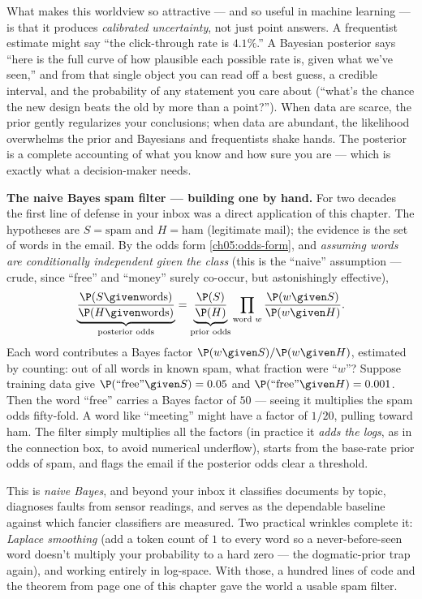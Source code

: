 \begin{aestheticbox}
What makes this worldview so attractive --- and so useful in machine learning --- is
that it produces \emph{calibrated uncertainty}, not just point answers. A frequentist
estimate might say ``the click-through rate is $4.1\%$.'' A Bayesian posterior says ``here
is the full curve of how plausible each possible rate is, given what we've seen,'' and
from that single object you can read off a best guess, a credible interval, and the
probability of any statement you care about (``what's the chance the new design beats the
old by more than a point?''). When data are scarce, the prior gently regularizes your
conclusions; when data are abundant, the likelihood overwhelms the prior and Bayesians and
frequentists shake hands. The posterior is a complete accounting of what you know and how
sure you are --- which is exactly what a decision-maker needs.
\end{aestheticbox}

\begin{applicationbox}
\textbf{The naive Bayes spam filter --- building one by hand.}
For two decades the first line of defense in your inbox was a direct application of this
chapter. The hypotheses are $S = \text{spam}$ and $H = \text{ham}$ (legitimate mail); the
evidence is the set of words in the email. By the odds form \eqref{ch05:odds-form}, and
\emph{assuming words are conditionally independent given the class} (this is the ``naive''
assumption --- crude, since ``free'' and ``money'' surely co-occur, but astonishingly
effective),
\[
  \underbrace{\frac{\P(S\given \text{words})}{\P(H\given \text{words})}}_{\text{posterior odds}}
  = \underbrace{\frac{\P(S)}{\P(H)}}_{\text{prior odds}}
    \prod_{\text{word } w}\frac{\P(w\given S)}{\P(w\given H)}.
\]
Each word contributes a Bayes factor $\P(w\given S)/\P(w\given H)$, estimated by counting:
out of all words in known spam, what fraction were ``$w$''? Suppose training data give
$\P(\text{``free''}\given S)=0.05$ and $\P(\text{``free''}\given H)=0.001$. Then the word
``free'' carries a Bayes factor of $50$ --- seeing it multiplies the spam odds fifty-fold.
A word like ``meeting'' might have a factor of $1/20$, pulling toward ham. The filter
simply multiplies all the factors (in practice it \emph{adds the logs}, as in the
connection box, to avoid numerical underflow), starts from the base-rate prior odds of
spam, and flags the email if the posterior odds clear a threshold.

This is \emph{naive Bayes}, and beyond your inbox it classifies documents by topic,
diagnoses faults from sensor readings, and serves as the dependable baseline against which
fancier classifiers are measured. Two practical wrinkles complete it: \emph{Laplace
smoothing} (add a token count of $1$ to every word so a never-before-seen word doesn't
multiply your probability to a hard zero --- the dogmatic-prior trap again), and working
entirely in log-space. With those, a hundred lines of code and the theorem from page one
of this chapter gave the world a usable spam filter.
\end{applicationbox}

